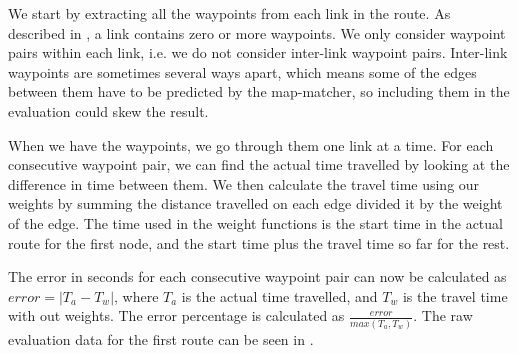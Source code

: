 We start by extracting all the waypoints from each link in the route. As described in , a link contains zero or more waypoints. We only consider waypoint pairs within each link, i.e. we do not consider inter-link waypoint pairs. Inter-link waypoints are sometimes several ways apart, which means some of the edges between them have to be predicted by the map-matcher, so including them in the evaluation could skew the result.

When we have the waypoints, we go through them one link at a time. For each consecutive waypoint pair, we can find the actual time travelled by looking at the difference in time between them. We then calculate the travel time using our weights by summing the distance travelled on each edge divided it by the weight of the edge. The time used in the weight functions is the start time in the actual route for the first node, and the start time plus the travel time so far for the rest.

The error in seconds for each consecutive waypoint pair can now be calculated as $error = |T_a - T_w|$, where $T_a$ is the actual time travelled, and $T_w$ is the travel time with out weights. The error percentage is calculated as $\frac{error}{max(T_a, T_w)}$. The raw evaluation data for the first route can be seen in .
